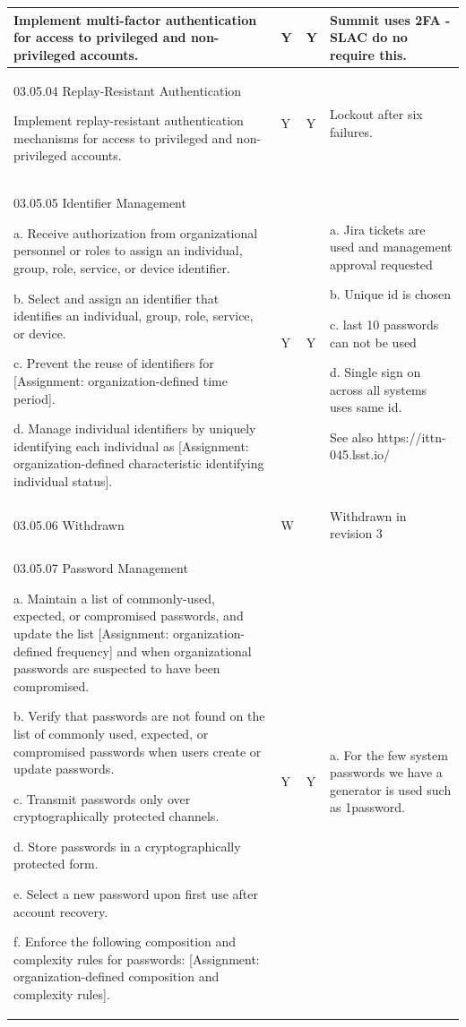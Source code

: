 \begin{longtable} {|p{}|p{}|p{}|p{} |}
{Implement multi-factor authentication for access to privileged and non-privileged accounts.}&{Y}&{Y}&{Summit uses 2FA - SLAC do no require this. } \\ \hline
{03.05.04 Replay-Resistant Authentication

Implement replay-resistant authentication mechanisms for access to privileged and non-privileged accounts.}&{Y}&{Y}&{Lockout after six failures.} \\ \hline
{03.05.05 Identifier Management

a. Receive authorization from organizational personnel or roles to assign an individual, group, role, service, or device identifier.

b. Select and assign an identifier that identifies an individual, group, role, service, or device.

c. Prevent the reuse of identifiers for [Assignment: organization-defined time period].

d. Manage individual identifiers by uniquely identifying each individual as [Assignment: organization-defined characteristic identifying individual status].}&{Y}&{Y}&{a. Jira tickets are used and management approval requested

b. Unique id is chosen

c. last 10 passwords can not be used

d. Single sign on across all systems uses same id.

See also https://ittn-045.lsst.io/} \\ \hline
{03.05.06 Withdrawn}&{W}&{}&{Withdrawn in revision 3} \\ \hline
{03.05.07 Password Management

a. Maintain a list of commonly-used, expected, or compromised passwords, and update the list [Assignment: organization-defined frequency] and when organizational passwords are suspected to have been compromised.

b. Verify that passwords are not found on the list of commonly used, expected, or compromised passwords when users create or update passwords.

c. Transmit passwords only over cryptographically protected channels.

d. Store passwords in a cryptographically protected form.

e. Select a new password upon first use after account recovery.

f. Enforce the following composition and complexity rules for passwords: [Assignment: organization-defined composition and complexity rules].}&{Y}&{Y}&{a. For the few system passwords we have  a generator is used such as 1password.

}
\end{longtable}
